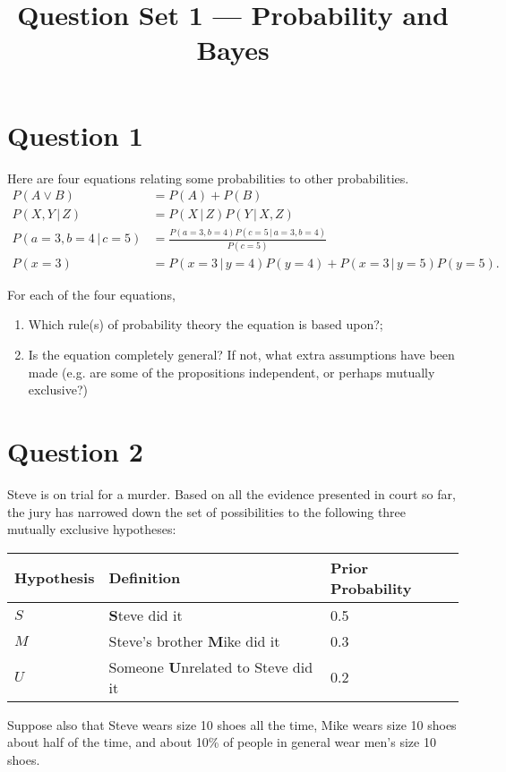 \documentclass[a4paper, 12pt]{article}
\title{Question Set 1 --- Probability and Bayes}
\author{}
\date{}
\newcommand{\given}{\,|\,}
\begin{document}
\maketitle


\setlength{\parindent}{0pt}
\setlength{\parskip}{8pt}

\section*{Question 1}
Here are four equations relating some probabilities to other probabilities.
\begin{align}
P(A \vee B) &= P(A) + P(B) \\
P(X, Y \given Z) &= P(X \given Z)P(Y \given X, Z) \\
P(a=3, b=4 \given c=5) &= \frac{P(a=3, b=4)P(c = 5 \given a=3, b=4)}
                          {P(c=5)} \\
P(x=3) &= P(x=3 \given y=4)P(y=4) + P(x=3 \given y=5)P(y=5).
\end{align}

For each of the four equations,
\begin{enumerate}
\item Which rule(s) of probability theory the equation is based upon?;
\item Is the equation completely general? If not,
what extra assumptions have been made (e.g. are some of the
propositions independent, or perhaps mutually exclusive?)
\end{enumerate}

\section*{Question 2}

Steve is on trial for a murder. Based on all the evidence presented in court
so far, the jury has narrowed down the set of possibilities to the following
three mutually exclusive hypotheses:\\

\begin{center}
\begin{tabular}{|l|l|l|}
\hline
Hypothesis	&	Definition	  &	Prior Probability\\
\hline
$S$		& {\bf S}teve did it	         & 0.5 \\
$M$		& Steve's brother {\bf M}ike did it & 0.3 \\
$U$     & Someone {\bf U}nrelated to Steve did it & 0.2 \\
\hline
\end{tabular}
\end{center}
Suppose also that Steve wears size 10 shoes all the time,
Mike wears size 10 shoes about
half of the time, and about 10\% of people in general wear men's size 10 shoes.
\end{document}
